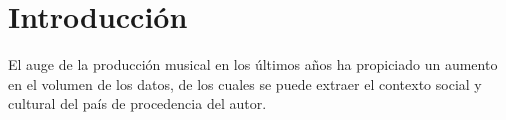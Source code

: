 \chapter{Introducción}
\label{cap:introduccion}


El auge de la producción musical en los últimos años ha propiciado un aumento en el volumen de los datos, de los cuales se puede extraer el contexto social y cultural del país de procedencia del autor. 